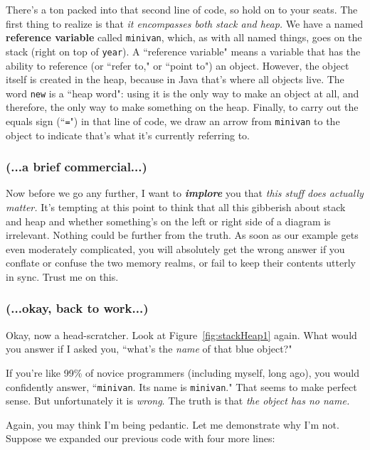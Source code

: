 There's a ton packed into that second line of code, so hold on to your seats.
The first thing to realize is that \textit{it encompasses both stack and
heap.} We have a named \textbf{reference variable} called \texttt{minivan},
which, as with all named things, goes on the stack (right on top of
\texttt{year}). A ``reference variable" means a variable that has the ability
to reference (or ``refer to," or ``point to") an object. However, the object
itself is created in the heap, because in Java that's where all objects live.
The word \texttt{new} is a ``heap word": using it is the only way to make an
object at all, and therefore, the only way to make something on the heap.
Finally, to carry out the equals sign (``\texttt{=}") in that line of code, we
draw an arrow from \texttt{minivan} to the object to indicate that's what it's
currently referring to.

\subsubsection{(...a brief commercial...)}

Now before we go any further, I want to \textit{\textbf{implore}} you that
\textit{this stuff does actually matter.} It's tempting at this point to think
that all this gibberish about stack and heap and whether something's on the
left or right side of a diagram is irrelevant.  Nothing could be further from
the truth. As soon as our example gets even moderately complicated, you will
absolutely get the wrong answer if you conflate or confuse the two memory
realms, or fail to keep their contents utterly in sync. Trust me on this.

\subsubsection{(...okay, back to work...)}

Okay, now a head-scratcher. Look at Figure~\ref{fig:stackHeap1} again. What
would you answer if I asked you, ``what's the \textit{name} of that blue
object?"

If you're like 99\% of novice programmers (including myself, long ago), you
would confidently answer, ``\texttt{minivan}. Its name is \texttt{minivan}."
That seems to make perfect sense. But unfortunately it is \textit{wrong}. The
truth is that \textit{the object has no name.}

Again, you may think I'm being pedantic. Let me demonstrate why I'm not.
Suppose we expanded our previous code with four more lines:

